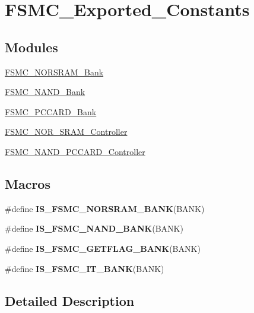 \hypertarget{group___f_s_m_c___exported___constants}{\section{F\-S\-M\-C\-\_\-\-Exported\-\_\-\-Constants}
\label{group___f_s_m_c___exported___constants}
}
\subsection*{Modules}
\begin{DoxyCompactItemize}
\item 
\hyperlink{group___f_s_m_c___n_o_r_s_r_a_m___bank}{F\-S\-M\-C\-\_\-\-N\-O\-R\-S\-R\-A\-M\-\_\-\-Bank}
\item 
\hyperlink{group___f_s_m_c___n_a_n_d___bank}{F\-S\-M\-C\-\_\-\-N\-A\-N\-D\-\_\-\-Bank}
\item 
\hyperlink{group___f_s_m_c___p_c_c_a_r_d___bank}{F\-S\-M\-C\-\_\-\-P\-C\-C\-A\-R\-D\-\_\-\-Bank}
\item 
\hyperlink{group___f_s_m_c___n_o_r___s_r_a_m___controller}{F\-S\-M\-C\-\_\-\-N\-O\-R\-\_\-\-S\-R\-A\-M\-\_\-\-Controller}
\item 
\hyperlink{group___f_s_m_c___n_a_n_d___p_c_c_a_r_d___controller}{F\-S\-M\-C\-\_\-\-N\-A\-N\-D\-\_\-\-P\-C\-C\-A\-R\-D\-\_\-\-Controller}
\end{DoxyCompactItemize}
\subsection*{Macros}
\begin{DoxyCompactItemize}
\item 
\#define {\bfseries I\-S\-\_\-\-F\-S\-M\-C\-\_\-\-N\-O\-R\-S\-R\-A\-M\-\_\-\-B\-A\-N\-K}(B\-A\-N\-K)
\item 
\#define {\bfseries I\-S\-\_\-\-F\-S\-M\-C\-\_\-\-N\-A\-N\-D\-\_\-\-B\-A\-N\-K}(B\-A\-N\-K)
\item 
\#define {\bfseries I\-S\-\_\-\-F\-S\-M\-C\-\_\-\-G\-E\-T\-F\-L\-A\-G\-\_\-\-B\-A\-N\-K}(B\-A\-N\-K)
\item 
\#define {\bfseries I\-S\-\_\-\-F\-S\-M\-C\-\_\-\-I\-T\-\_\-\-B\-A\-N\-K}(B\-A\-N\-K)
\end{DoxyCompactItemize}


\subsection{Detailed Description}


